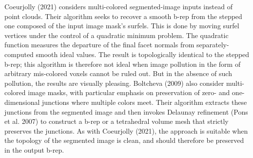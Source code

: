 Coeurjolly (2021) considers multi-colored segmented-image inputs instead of point clouds.  Their algorithm seeks to recover a smooth b-rep from the stepped one composed of the input image mask's surfels.  This is done by moving surfel vertices under the control of a quadratic minimum problem.  The quadratic function measures the departure of the final facet normals from separately-computed smooth ideal values.  The result is topologically identical to the stepped b-rep; this algorithm is therefore not ideal when image pollution in the form of arbitrary mis-colored voxels cannot be ruled out.  But in the absence of such pollution, the results are visually pleasing.  Boltcheva (2009) also consider multi-colored image masks, with particular emphasis on preservation of zero- and one-dimensional junctions where multiple colors meet.  Their algorithm extracts these junctions from the segmented image and then invokes Delaunay refinement (Pons et al. 2007) to construct a b-rep or a tetrahedral volume mesh that strictly preserves the junctions.  As with Coeurjolly (2021), the approach is suitable when the topology of the segmented image is clean, and should therefore be preserved in the output b-rep.

